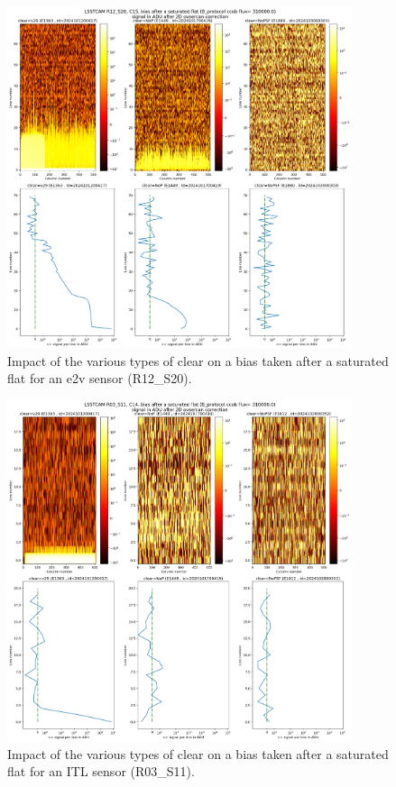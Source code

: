 \begin{figure}
\begin{centering}
\includegraphics[width=0.9\textwidth]{figures/plots_R12_S20_C15_E1880_bias_2024103000303.png}
\end{centering}
\caption{Impact of the various types of clear on a bias
taken after a saturated flat for an e2v sensor (R12\_S20).}
\label{fig:clear_e2v}
\end{figure}


\begin{figure}
\begin{centering}
\includegraphics[width=0.9\textwidth]{figures/plots_R03_S11_C14_E1812_bias_2024102800352.png}
\end{centering}
\caption{Impact of the various types of clear on a bias
taken after a saturated flat for an ITL sensor (R03\_S11).}
\label{fig:clear_ITL}
\end{figure}

